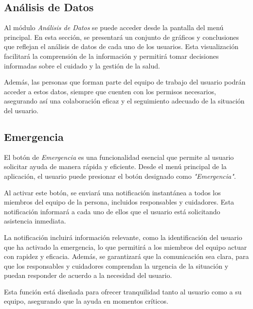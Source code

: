\documentclass[a4paper,12pt]{article}
\begin{document}
    \subsection{Análisis de Datos}
    \par Al módulo \textit{Análisis de Datos} se puede acceder desde la pantalla del menú principal. En esta sección, se presentará un conjunto de gráficos y conclusiones que reflejan el análisis de datos de cada uno de los usuarios. Esta visualización facilitará la comprensión de la información y permitirá tomar decisiones informadas sobre el cuidado y la gestión de la salud.
    \par Además, las personas que forman parte del equipo de trabajo del usuario podrán acceder a estos datos, siempre que cuenten con los permisos necesarios, asegurando así una colaboración eficaz y el seguimiento adecuado de la situación del usuario.
    \subsection{Emergencia}
    \par El botón de \textit{Emergencia} es una funcionalidad esencial que permite al usuario solicitar ayuda de manera rápida y eficiente. Desde el menú principal de la aplicación, el usuario puede presionar el botón designado como \textit{"Emergencia"}.
    \par Al activar este botón, se enviará una notificación instantánea a todos los miembros del equipo de la persona, incluidos responsables y cuidadores. Esta notificación informará a cada uno de ellos que el usuario está solicitando asistencia inmediata.
    \par La notificación incluirá información relevante, como la identificación del usuario que ha activado la emergencia, lo que permitirá a los miembros del equipo actuar con rapidez y eficacia. Además, se garantizará que la comunicación sea clara, para que los responsables y cuidadores comprendan la urgencia de la situación y puedan responder de acuerdo a la necesidad del usuario.
    \par Esta función está diseñada para ofrecer tranquilidad tanto al usuario como a su equipo, asegurando que la ayuda en momentos críticos.
\end{document}
